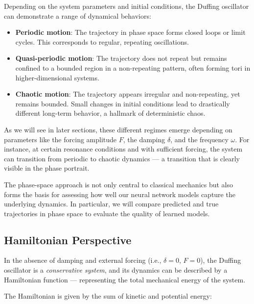 \documentclass{article}
\begin{document}
Depending on the system parameters and initial conditions, the Duffing oscillator can demonstrate a range of dynamical behaviors:

\begin{itemize}
    \item \textbf{Periodic motion}: The trajectory in phase space forms closed loops or limit cycles. This corresponds to regular, repeating oscillations.
    \item \textbf{Quasi-periodic motion}: The trajectory does not repeat but remains confined to a bounded region in a non-repeating pattern, often forming tori in higher-dimensional systems.
    \item \textbf{Chaotic motion}: The trajectory appears irregular and non-repeating, yet remains bounded. Small changes in initial conditions lead to drastically different long-term behavior, a hallmark of deterministic chaos.
\end{itemize}

As we will see in later sections, these different regimes emerge depending on parameters like the forcing amplitude $F$, the damping $\delta$, and the frequency $\omega$. For instance, at certain resonance conditions and with sufficient forcing, the system can transition from periodic to chaotic dynamics — a transition that is clearly visible in the phase portrait.

The phase-space approach is not only central to classical mechanics but also forms the basis for assessing how well our neural network models capture the underlying dynamics. In particular, we will compare predicted and true trajectories in phase space to evaluate the quality of learned models.



\subsection{Hamiltonian Perspective}

In the absence of damping and external forcing (i.e., $\delta = 0$, $F = 0$), the Duffing oscillator is a \textit{conservative system}, and its dynamics can be described by a Hamiltonian function — representing the total mechanical energy of the system.

The Hamiltonian is given by the sum of kinetic and potential energy:
\end{document}
